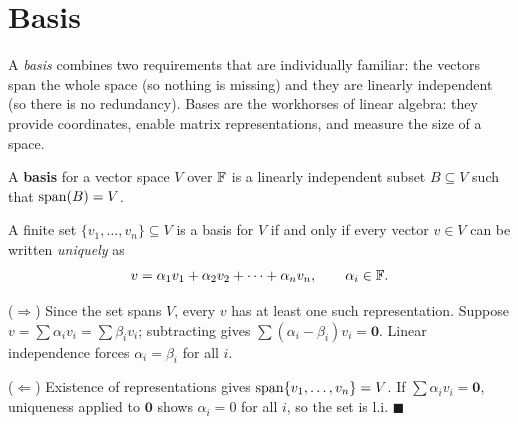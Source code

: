 \section{Basis}
\label{sec:basis}

A \emph{basis} combines two requirements that are individually familiar: the
vectors span the whole space (so nothing is missing) and they are linearly
independent (so there is no redundancy).  Bases are the workhorses of linear
algebra: they provide coordinates, enable matrix representations, and measure
the size of a space.

\begin{defbox}
\label{def:basis}
A \textbf{basis} for a vector space $V$ over $\mathbb{F}$ is a linearly independent
subset $B\subseteq V$ such that $\operatorname{span}(B)=V$.
\end{defbox}

\begin{thmbox}
\label{thm:basis-unique-rep}
A finite set $\{v_1,\ldots,v_n\}\subseteq V$ is a basis for $V$ if and only if
every vector $v\in V$ can be written \emph{uniquely} as
\[
    v = \alpha_1 v_1 + \alpha_2 v_2 + \cdots + \alpha_n v_n,
    \qquad \alpha_i\in\mathbb{F}.
\]
\end{thmbox}

\begin{proofbox}
($\Rightarrow$) Since the set spans $V$, every $v$ has at least one such
representation.  Suppose $v=\sum\alpha_i v_i=\sum\beta_i v_i$; subtracting
gives $\sum(\alpha_i-\beta_i)v_i=\mathbf{0}$.  Linear independence forces
$\alpha_i=\beta_i$ for all $i$.

($\Leftarrow$) Existence of representations gives $\operatorname{span}\{v_1,\ldots,v_n\}=V$.
If $\sum\alpha_i v_i=\mathbf{0}$, uniqueness applied to $\mathbf{0}$ shows
$\alpha_i=0$ for all $i$, so the set is l.i.
\hfill$\blacksquare$
\end{proofbox}

